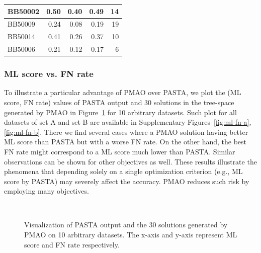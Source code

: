 \begin{table}[!htbp]
\begin{tabular}{|l|r|r|r||r|}
		\hline
		BB50002 & \cellcolor[rgb]{ .988,  1,  .992}0.50 & \cellcolor[rgb]{ .384,  .745,  .478}0.40 & \cellcolor[rgb]{ .941,  .98,  .953}0.49 & \cellcolor[rgb]{ .984,  .733,  .741}14 \\
		\hline
		BB50009 & \cellcolor[rgb]{ .988,  1,  .992}0.24 & \cellcolor[rgb]{ .384,  .745,  .478}0.08 & \cellcolor[rgb]{ .788,  .914,  .82}0.19 & \cellcolor[rgb]{ .98,  .631,  .643}19 \\
		\hline
		BB50014 & \cellcolor[rgb]{ .988,  1,  .992}0.41 & \cellcolor[rgb]{ .384,  .745,  .478}0.26 & \cellcolor[rgb]{ .835,  .933,  .863}0.37 & \cellcolor[rgb]{ .984,  .812,  .824}10 \\
		\hline
		BB50006 & \cellcolor[rgb]{ .988,  1,  .992}0.21 & \cellcolor[rgb]{ .384,  .745,  .478}0.12 & \cellcolor[rgb]{ .725,  .886,  .769}0.17 & \cellcolor[rgb]{ .988,  .89,  .902}6 \\
		\hline
	\end{tabular}%
	\label{tab:pmao-pasta-b}%
\end{table}%

\subsubsection{ML score vs. FN rate}
To illustrate a particular advantage of PMAO over PASTA, we plot the (ML score, FN rate) values of PASTA output and 30 solutions in the tree-space generated by PMAO in Figure~\ref{fig:ml-fn} for 10 arbitrary datasets. Such plot for all datasets of set A and set B are available in Supplementary Figures~\ref{fig:ml-fn-a}, \ref{fig:ml-fn-b}. There we find several cases where a PMAO solution having better ML score than PASTA but with a worse FN rate.  On the other hand, the best FN rate might correspond to a ML score much lower than PASTA. Similar observations can be shown for other objectives as well. These results illustrate the phenomena that depending solely on a single optimization criterion (e.g., ML score by PASTA) may severely affect the accuracy. PMAO reduces such risk by employing many objectives.

\begin{figure}[!htbp]%
	\begin{adjustwidth}{-1cm}{}
		\centering
		\\%
	\end{adjustwidth}
	\caption{Visualization of PASTA output and the 30 solutions generated by PMAO on 10 arbitrary datasets. The x-axis and y-axis represent ML score and FN rate respectively.}
	\label{fig:ml-fn}
\end{figure}

